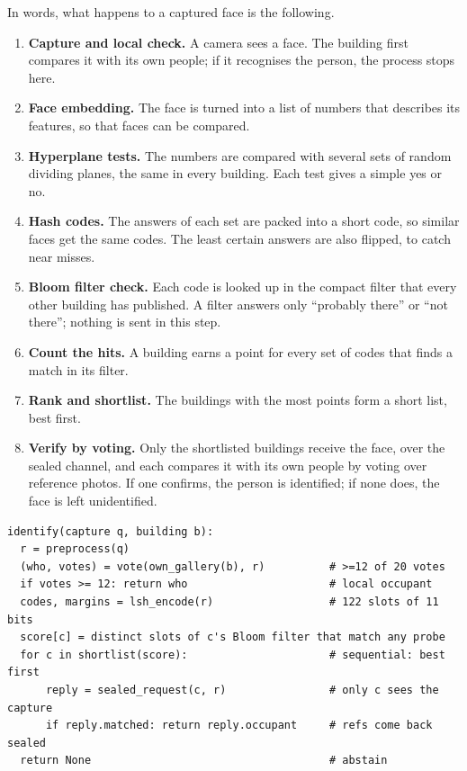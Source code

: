 \documentclass[12pt,a4paper,oneside]{report}
\begin{document}
In words, what happens to a captured face is the following.
\begin{enumerate}
\item \textbf{Capture and local check.} A camera sees a face. The building first compares it with its own people; if it recognises the person, the process stops here.
\item \textbf{Face embedding.} The face is turned into a list of numbers that describes its features, so that faces can be compared.
\item \textbf{Hyperplane tests.} The numbers are compared with several sets of random dividing planes, the same in every building. Each test gives a simple yes or no.
\item \textbf{Hash codes.} The answers of each set are packed into a short code, so similar faces get the same codes. The least certain answers are also flipped, to catch near misses.
\item \textbf{Bloom filter check.} Each code is looked up in the compact filter that every other building has published. A filter answers only ``probably there'' or ``not there''; nothing is sent in this step.
\item \textbf{Count the hits.} A building earns a point for every set of codes that finds a match in its filter.
\item \textbf{Rank and shortlist.} The buildings with the most points form a short list, best first.
\item \textbf{Verify by voting.} Only the shortlisted buildings receive the face, over the sealed channel, and each compares it with its own people by voting over reference photos. If one confirms, the person is identified; if none does, the face is left unidentified.
\end{enumerate}

{\footnotesize
\begin{verbatim}
identify(capture q, building b):
  r = preprocess(q)
  (who, votes) = vote(own_gallery(b), r)          # >=12 of 20 votes
  if votes >= 12: return who                      # local occupant
  codes, margins = lsh_encode(r)                  # 122 slots of 11 bits
  score[c] = distinct slots of c's Bloom filter that match any probe
  for c in shortlist(score):                      # sequential: best first
      reply = sealed_request(c, r)                # only c sees the capture
      if reply.matched: return reply.occupant     # refs come back sealed
  return None                                     # abstain
\end{verbatim}}
\end{document}
